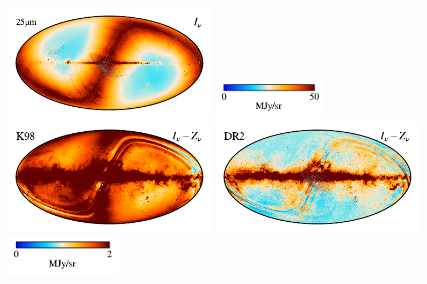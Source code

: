 \documentclass[twocolumn]{aa}
\begin{document}
\begin{figure}
    \includegraphics[height=2.90cm]{figs/compare_freq_maps/cosmoglobe_ma_06.pdf}%
    \includegraphics[width=2.90cm,angle=90]{figs/compare_freq_maps/cbar_tot_06.pdf}%
    \includegraphics[height=2.90cm]{figs/compare_freq_maps/dirbe_zsma_06.pdf}%
    \includegraphics[height=2.90cm]{figs/compare_freq_maps/cosmoglobe_zsma_06.pdf}%
    \includegraphics[width=2.90cm,angle=90]{figs/compare_freq_maps/cbar_06.pdf}%
      \\


\end{figure}
\end{document}
